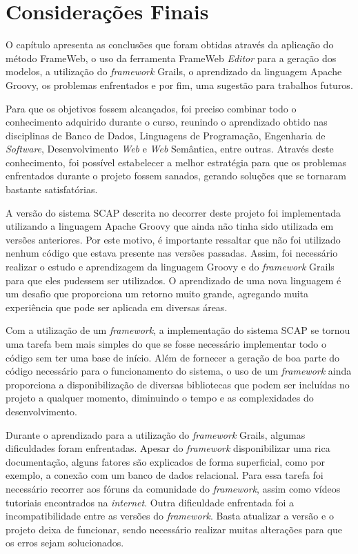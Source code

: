 \chapter{Considerações Finais}
\label{sec-conclusoes}

O capítulo apresenta as conclusões que foram obtidas através da aplicação do método FrameWeb, o uso da ferramenta FrameWeb \textit{Editor} para a geração dos modelos, a utilização do \textit{framework} Grails, o aprendizado da linguagem Apache Groovy, os problemas enfrentados e por fim, uma sugestão para trabalhos futuros.  

Para que os objetivos fossem alcançados, foi preciso combinar todo o conhecimento adquirido durante o curso, reunindo o aprendizado obtido nas disciplinas de Banco de Dados, Linguagens de Programação, Engenharia de \textit{Software}, Desenvolvimento \textit{Web} e \textit{Web} Semântica, entre outras. Através deste conhecimento, foi possível estabelecer a melhor estratégia para que os problemas enfrentados durante o projeto fossem sanados, gerando soluções que se tornaram bastante satisfatórias.  

A versão do sistema SCAP descrita no decorrer deste projeto foi implementada utilizando a linguagem Apache Groovy que ainda não tinha sido utilizada em versões anteriores. Por este motivo, é importante ressaltar que não foi utilizado nenhum código que estava presente nas versões passadas. Assim, foi necessário realizar o estudo e aprendizagem da linguagem Groovy e do \textit{framework} Grails para que eles pudessem ser utilizados. O aprendizado de uma nova linguagem é um desafio que proporciona um retorno muito grande, agregando muita experiência que pode ser aplicada em diversas áreas.

Com a utilização de um \textit{framework}, a implementação do sistema SCAP se tornou uma tarefa bem mais simples do que se fosse necessário implementar todo o código sem ter uma base de início. Além de fornecer a geração de boa parte do código necessário para o funcionamento do sistema, o uso de um \textit{framework} ainda proporciona a disponibilização de diversas bibliotecas que podem ser incluídas no projeto a qualquer momento, diminuindo o tempo e as complexidades do desenvolvimento.  

Durante o aprendizado para a utilização do \textit{framework} Grails, algumas dificuldades foram enfrentadas. Apesar do \textit{framework} disponibilizar uma rica documentação, alguns fatores são explicados de forma superficial, como por exemplo, a conexão com um banco de dados relacional. Para essa tarefa foi necessário recorrer aos fóruns da comunidade do \textit{framework}, assim como vídeos tutoriais encontrados na \textit{internet}. Outra dificuldade enfrentada foi a incompatibilidade entre as versões do \textit{framework}. Basta atualizar a versão e o projeto deixa de funcionar, sendo necessário realizar muitas alterações para que os erros sejam solucionados.

